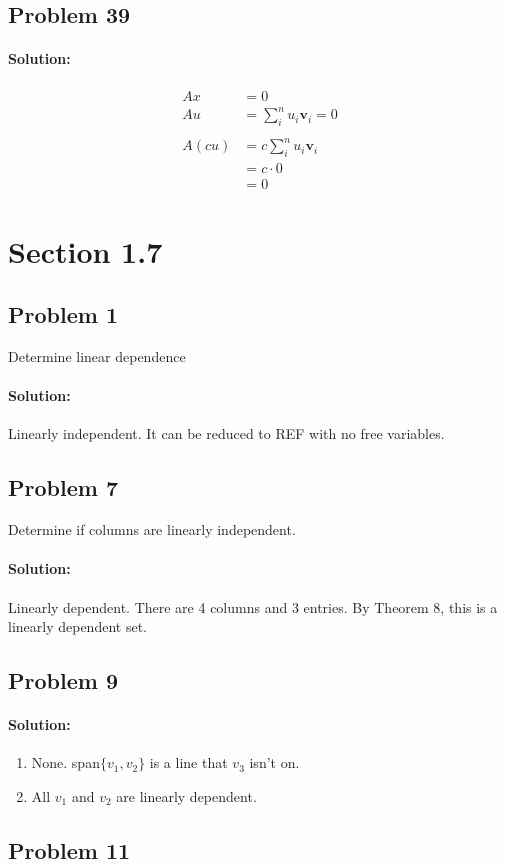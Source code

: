 \documentclass[11pt, notitlepage]{report}
\newenvironment{solution}{\paragraph{\small Solution:}}{\hfill}
\begin{document}
\subsection{Problem 39}
\begin{solution}

\begin{align*}
Ax&=0\\
Au&=\sum_{i}^{n}{u_i\textbf{v}_i}=0 \\\\
A(cu)&=c\sum_{i}^{n}{u_i\textbf{v}_i}\\
&=c\cdot0\\
&=0
\end{align*}


\end{solution}

\section{Section 1.7}
\subsection{Problem 1}
Determine linear dependence
\begin{solution}
Linearly independent. It can be reduced to REF with no free variables.
\end{solution}

\subsection{Problem 7}
Determine if columns are linearly independent.
\begin{solution}
Linearly dependent. There are 4 columns and 3 entries. By Theorem 8, this is a linearly dependent set.
\end{solution}
\subsection{Problem 9}
\begin{solution}
\begin{enumerate}[label=\alph*.)]
	\item None. span$\{v_1, v_2\}$ is a line that $v_3$ isn't on.
	\item All $v_1$ and $v_2$ are linearly dependent.
\end{enumerate}
\end{solution}
\subsection{Problem 11}
\end{document}
